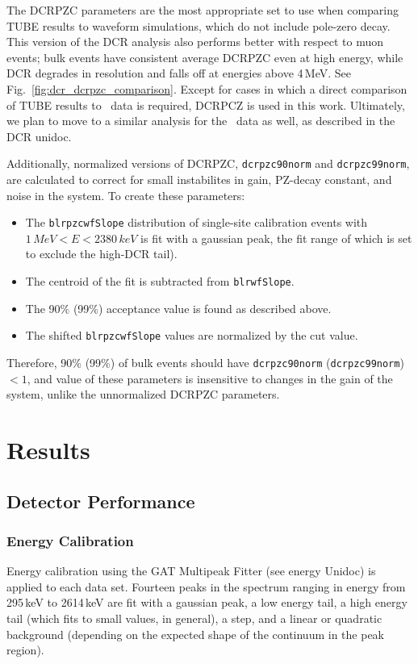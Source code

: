 \documentclass[groupedaddress,rmp,amsmath,amssymb,bibnotes,altaffilletter,twocolumn]{revtex4-1}
\begin{document}
The DCRPZC parameters are the most appropriate set to use when comparing TUBE results to waveform simulations, which do not include pole-zero decay. This version of the DCR analysis also performs better with respect to muon events; bulk events have consistent average DCRPZC even at high energy, while DCR degrades in resolution and falls off at energies above 4\,MeV. See Fig.~\ref{fig:dcr_dcrpzc_comparison}. Except for cases in which a direct comparison of TUBE results to \MJ\ data is required, DCRPCZ is used in this work. Ultimately, we plan to move to a similar analysis for the \MJ\ data as well, as described in the DCR unidoc. 

Additionally, normalized versions of DCRPZC, {\tt dcrpzc90norm} and {\tt dcrpzc99norm}, are calculated to correct for small instabilites in gain, PZ-decay constant, and noise in the system. To create these parameters:
\begin{itemize}
\item The {\tt blrpzcwfSlope} distribution of single-site calibration events with $1\,MeV< E < 2380\,keV$ is fit with a gaussian peak, the fit range of which is set to exclude the high-DCR tail). 
\item The centroid of the fit is subtracted from {\tt blrwfSlope}.
\item The 90\% (99\%) acceptance value is found as described above.
\item The shifted {\tt blrpzcwfSlope} values are normalized by the cut value.
\end{itemize}

Therefore, 90\% (99\%) of bulk events should have {\tt dcrpzc90norm} ({\tt dcrpzc99norm}) $< 1$, and value of these parameters is insensitive to changes in the gain of the system, unlike the unnormalized DCRPZC parameters.  

\section{Results}
\subsection{Detector Performance}
\subsubsection{Energy Calibration}
Energy calibration using the GAT Multipeak Fitter (see energy Unidoc) is applied to each data set. Fourteen peaks in the spectrum ranging in energy from 295\,keV to 2614\,keV are fit with a gaussian peak, a low energy tail, a high energy tail (which fits to small values, in general), a step, and a linear or quadratic background (depending on the expected shape of the continuum in the peak region).
\end{document}
